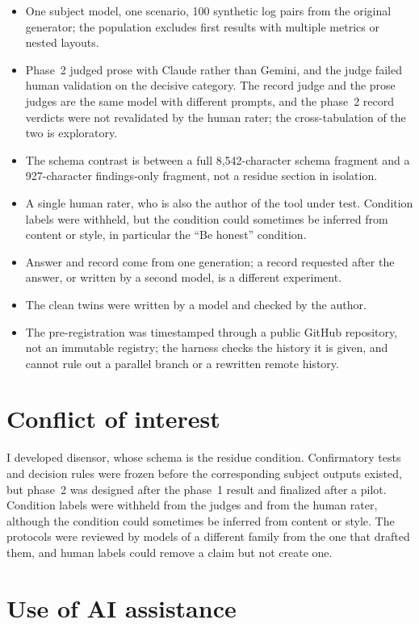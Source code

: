 \documentclass[11pt]{article}
\begin{document}
\begin{itemize}
\item One subject model, one scenario, 100 synthetic log pairs from the original
  generator; the population excludes first results with multiple metrics or nested
  layouts.
\item Phase~2 judged prose with Claude rather than Gemini, and the judge failed human
  validation on the decisive category. The record judge and the prose judges are the
  same model with different prompts, and the phase~2 record verdicts were not
  revalidated by the human rater; the cross-tabulation of the two is exploratory.
\item The schema contrast is between a full 8,542-character schema fragment and a
  927-character findings-only fragment, not a residue section in isolation.
\item A single human rater, who is also the author of the tool under test. Condition
  labels were withheld, but the condition could sometimes be inferred from content or
  style, in particular the ``Be honest'' condition.
\item Answer and record come from one generation; a record requested after the answer,
  or written by a second model, is a different experiment.
\item The clean twins were written by a model and checked by the author.
\item The pre-registration was timestamped through a public GitHub repository, not an
  immutable registry; the harness checks the history it is given, and cannot rule out a
  parallel branch or a rewritten remote history.
\end{itemize}

\section{Conflict of interest}
\label{sec:coi}

I developed disensor, whose schema is the residue condition. Confirmatory tests and
decision rules were frozen before the corresponding subject outputs existed, but
phase~2 was designed after the phase~1 result and finalized after a pilot. Condition labels
were withheld from the judges and from the human rater, although the condition could
sometimes be inferred from content or style. The protocols were reviewed by models of a
different family from the one that drafted them, and human labels could remove a claim
but not create one.

\section*{Use of AI assistance}
\end{document}
